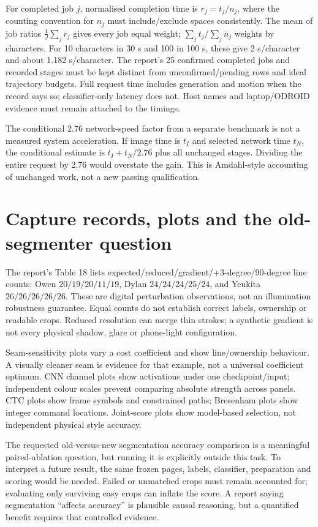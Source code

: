 For completed job $j$, normalised completion time is $r_j=t_j/n_j$, where
the counting convention for $n_j$ must include/exclude spaces consistently.
The mean of job ratios $\frac1J\sum_jr_j$ gives every job equal weight;
$\sum_jt_j/\sum_jn_j$ weights by characters. For 10 characters in 30 s
and 100 in 100 s, these give 2 s/character and about 1.182 s/character.
The report's 25 confirmed completed jobs and recorded stages must be kept
distinct from unconfirmed/pending rows and ideal trajectory budgets.
Full request time includes generation and motion when the record says so;
classifier-only latency does not. Host names and laptop/ODROID evidence
must remain attached to the timings.

The conditional 2.76 network-speed factor from a separate benchmark is not
a measured system acceleration. If image time is $t_I$ and selected network
time $t_N$, the conditional estimate is $t_I+t_N/2.76$ plus all unchanged
stages. Dividing the entire request by 2.76 would overstate the gain. This
is Amdahl-style accounting of unchanged work, not a new passing qualification.

\section{Capture records, plots and the old-segmenter question}
The report's Table 18 lists expected/reduced/gradient/+3-degree/90-degree
line counts: Owen $20/19/20/11/19$, Dylan $24/24/24/25/24$, and
Yeukita $26/26/26/26/26$. These are digital perturbation observations,
not an illumination robustness guarantee. Equal counts do not establish
correct labels, ownership or readable crops. Reduced resolution can merge
thin strokes; a synthetic gradient is not every physical shadow, glare or
phone-light configuration.

Seam-sensitivity plots vary a cost coefficient and show line/ownership
behaviour. A visually cleaner seam is evidence for that example, not a
universal coefficient optimum. CNN channel plots show activations under one
checkpoint/input; independent colour scales prevent comparing absolute
strength across panels. CTC plots show frame symbols and constrained paths;
Bresenham plots show integer command locations. Joint-score plots show
model-based selection, not independent physical style accuracy.

The requested old-versus-new segmentation accuracy comparison is a meaningful
paired-ablation question, but running it is explicitly outside this task.
To interpret a future result, the same frozen pages, labels, classifier,
preparation and scoring would be needed. Failed or unmatched crops must
remain accounted for; evaluating only surviving easy crops can inflate the
score. A report saying segmentation ``affects accuracy'' is plausible causal
reasoning, but a quantified benefit requires that controlled evidence.

